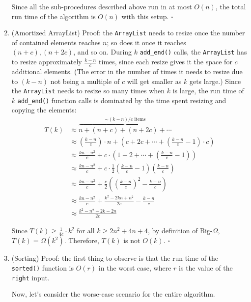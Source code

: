 \documentclass{article}
\begin{document}
\begin{enumerate}
    Since all the sub-procedures described above run in at most $O(n)$, the total run time of the algorithm is $O(n)$ with this setup. $\square$

    \pagebreak

  \item (Amortized ArrayList) Proof: the \texttt{ArrayList} needs to resize once the number of contained elements reaches $n$; so does it once it reaches $(n + c), (n + 2c)$, and so on. During $k$ \texttt{add\_end()} calls, the \texttt{ArrayList} has to resize approximately $\frac{k-n}{c}$ times, since each resize gives it the space for $c$ additional elements. (The error in the number of times it needs to resize due to $(k - n)$ not being a multiple of $c$ will get smaller as $k$ gets large.) Since the \texttt{ArrayList} needs to resize so many times when $k$ is large, the run time of $k$ \texttt{add\_end()} function calls is dominated by the time spent resizing and copying the elements:
    $$
      \begin{aligned}
        T(k) & \approx \overbrace{n + (n + c) + (n + 2c) + \cdots}^{\sim (k-n) / c\text{ items}} \\
             & \approx (\frac{k-n}{c}) \cdot n + (c + 2c + \cdots + (\frac{k-n}{c} - 1) \cdot c) \\
             & \approx \frac{kn-n^2}{c} + c \cdot (1 + 2 + \cdots + (\frac{k-n}{c} - 1))         \\
             & \approx \frac{kn-n^2}{c} + c \cdot \frac{1}{2}(\frac{k-n}{c} - 1)(\frac{k-n}{c})  \\
             & \approx \frac{kn-n^2}{c} + \frac{c}{2}((\frac{k-n}{c})^2 - \frac{k-n}{c})         \\
             & \approx \frac{kn-n^2}{c} + \frac{k^2 - 2kn + n^2}{2c} - \frac{k-n}{c}             \\
             & \approx \boxed{\frac{k^2 - n^2 - 2k - 2n}{2c}}
      \end{aligned}
    $$

    Since $T(k) \ge \frac{1}{4c} \cdot k^2$ for all $k \ge 2n^2 + 4n + 4$, by definition of Big-$\Omega$, $T(k) = \Omega(k^2)$. Therefore, $T(k)$ is not $O(k)$. $\square$

    \pagebreak

  \item (Sorting) Proof: the first thing to observe is that the run time of the \texttt{sorted()} function is $O(r)$ in the worst case, where $r$ is the value of the \texttt{right} input.

    Now, let's consider the worse-case scenario for the entire algorithm.


\end{enumerate}
\end{document}
